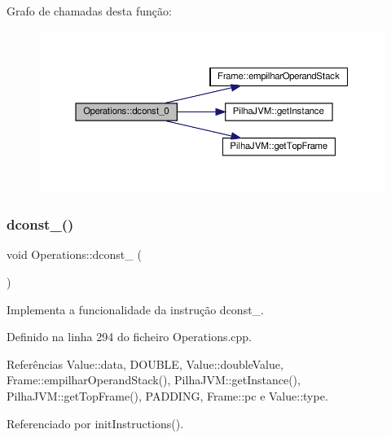 Grafo de chamadas desta função\+:
\nopagebreak
\begin{figure}[H]
\begin{center}
\leavevmode
\includegraphics[width=350pt]{classOperations_abd7f711342c43f7fa4e93b41931e6c86_cgraph}
\end{center}
\end{figure}
\mbox{\label{classOperations_a1a704891f81e3b532bf0eaad94429773}} 
\subsubsection{\texorpdfstring{dconst\+\_()}{dconst\_1()}}
{\footnotesize\ttfamily void Operations\+::dconst\+\_ (\begin{DoxyParamCaption}{ }\end{DoxyParamCaption})\hspace{0.3cm}{\ttfamily [private]}}



Implementa a funcionalidade da instrução dconst\+\_. 



Definido na linha 294 do ficheiro Operations.\+cpp.



Referências Value\+::data, D\+O\+U\+B\+LE, Value\+::double\+Value, Frame\+::empilhar\+Operand\+Stack(), Pilha\+J\+V\+M\+::get\+Instance(), Pilha\+J\+V\+M\+::get\+Top\+Frame(), P\+A\+D\+D\+I\+NG, Frame\+::pc e Value\+::type.



Referenciado por init\+Instructions().

